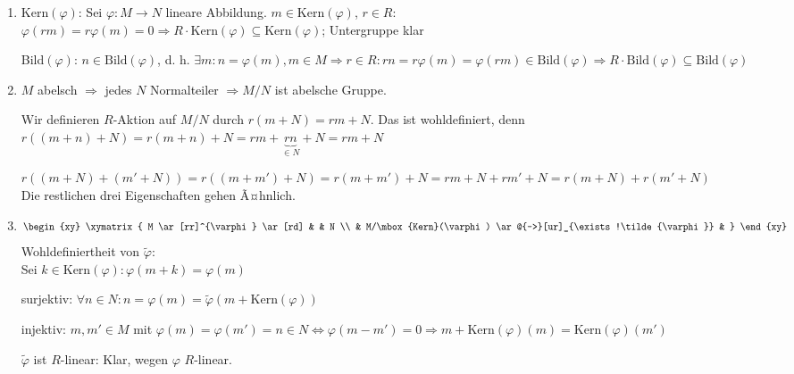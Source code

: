 \begin{Bew}
  \begin{enumerate}
    \item Kern$(\varphi)$: Sei $\varphi: M \rightarrow N$ lineare Abbildung. $m \in \mbox{Kern} (\varphi)$, $r \in R$:\\
          $\varphi(rm) = r\varphi(m) = 0 \Rightarrow R \cdot \mbox{Kern} (
          \varphi ) \subseteq \mbox{Kern} (\varphi)$; Untergruppe klar

	  Bild$(\varphi)$: $n \in \mbox{Bild} (\varphi) $, d. h. $\exists m: n = \varphi
   	  (m), m \in M \Rightarrow r \in R:
	  rn = r \varphi(m) = \varphi(rm) \in \mbox{Bild} (\varphi)  \Rightarrow R
	  \cdot \mbox{Bild} (\varphi) \subseteq \mbox{Bild} (\varphi)$
    \item $M$ abelsch $\Rightarrow$ jedes $N$ Normalteiler $\Rightarrow M/N$ ist
          abelsche Gruppe.

    	  Wir definieren $R$-Aktion auf $M/N$ durch $r(m + N) = rm + N$. Das ist 
    	  wohldefiniert, denn\\
	  $r((m+n)+N)=r(m+n) + N= rm + \underbrace{rn}_{\in N} + N = rm + N$

	  $r((m+N) + (m' + N ) ) = r((m+m')+N) = r(m+m') + N = rm + N + rm' + N =
	  r(m+N) + r(m'+N)$\\
	  Die restlichen drei Eigenschaften gehen Ã¤hnlich.
	  
    \item
	$$\begin{xy}
              \xymatrix{
                M \ar[rr]^{\varphi} \ar[rd] &     &  N \\
                                            &  M/\mbox{Kern}(\varphi) \ar@{-->}[ur]_{\exists!\tilde{\varphi}}  & }
          \end{xy}$$
	  Wohldefiniertheit von $\tilde{\varphi}$:\\
	  Sei $k \in \textrm{Kern}(\varphi): \varphi(m+k) = \varphi(m)$

	  surjektiv: $\forall n \in N: n = \varphi(m) = \tilde{\varphi}(m+ 
	  \mbox{Kern}(\varphi))$

	  injektiv: $m, m' \in M$ mit $\varphi(m) = \varphi(m') = n \in N \Leftrightarrow 
	  \varphi(m-m') = 0 \Rightarrow m + \mbox{Kern}(\varphi)(m) = 
	  \mbox{Kern}(\varphi)(m')$

	  $\tilde{\varphi}$ ist $R$-linear: Klar, wegen $\varphi$ $R$-linear.
  \end{enumerate}
\end{Bew}

